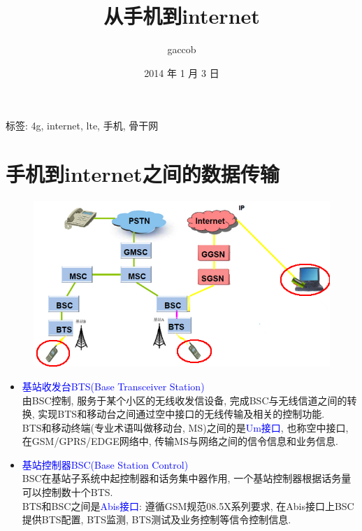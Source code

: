 

\title {\ZHH \huge 从手机到internet}
\author {\small gaccob}
\date {\small 2014 年 1 月 3 日}
\maketitle
\begin {center}
{\ZHH \small 标签: 4g, internet, lte, 手机, 骨干网}
\end {center}

\vspace {10pt}
\section {\ZHH 手机到internet之间的数据传输} {
    \begin {figure} [htbp]
        \centering
        \includegraphics [width=400pt, keepaspectratio] {transfer.png}
    \end {figure}

    \begin {itemize}
        \item { \textcolor {blue} {基站收发台BTS(Base Transceiver Station) } } \\
        { 由BSC控制, 服务于某个小区的无线收发信设备, 完成BSC与无线信道之间的转换, 实现BTS和移动台之间通过空中接口的无线传输及相关的控制功能. } \\
        { BTS和移动终端(专业术语叫做移动台, MS)之间的是\textcolor{blue}{Um接口}, 也称空中接口, 在GSM/GPRS/EDGE网络中, 传输MS与网络之间的信令信息和业务信息. } \\

        \item { \textcolor {blue} {基站控制器BSC(Base Station Control)} } \\
        { BSC在基站子系统中起控制器和话务集中器作用, 一个基站控制器根据话务量可以控制数十个BTS. } \\
        { BTS和BSC之间是\textcolor{blue}{Abis接口}: 遵循GSM规范08.5X系列要求, 在Abis接口上BSC提供BTS配置, BTS监测, BTS测试及业务控制等信令控制信息. } \\


\end{itemize}}
